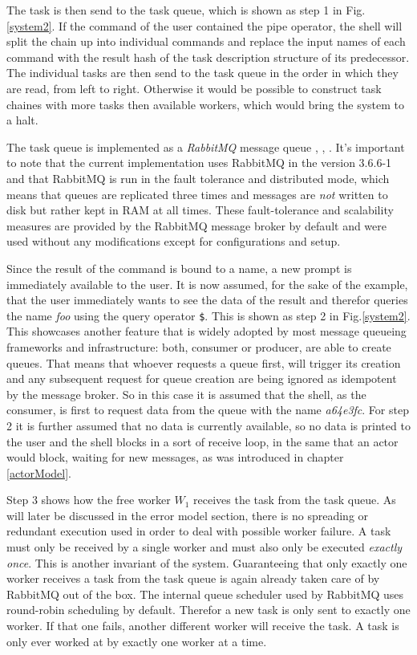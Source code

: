 The task is then send to the task queue, which is shown as step
1 in Fig.\ref{system2}. If the command of the user contained the
pipe operator, the shell will split the chain up into individual
commands and replace the input names of each command with the
result hash of the task description structure of its
predecessor. The individual tasks are then send to the task
queue in the order in which they are read, from left to right.
Otherwise it would be possible to construct task chaines with
more tasks then available workers, which would bring the system
to a halt.

The task queue is implemented
as a \textit{RabbitMQ} message queue \cite{rabbitmq},
\cite{rabbitmqwiki}, \cite{rabbitmqbook}. It's important to
note that the current implementation uses RabbitMQ in the
version 3.6.6-1 and that RabbitMQ is run in the fault tolerance
and distributed mode, which means that queues are replicated three
times and messages are \textit{not} written to disk but rather kept in
RAM at all times. These fault-tolerance and scalability measures
are provided by the RabbitMQ message broker by default and were
used without any modifications except for configurations and
setup.
\newline

Since the result of the command is bound to a name, a new
prompt is immediately available to the user. It is now assumed,
for the sake of the example, that the user immediately wants to
see the data of the result and therefor queries the name
\textit{foo} using the query operator \texttt{\$}. This is
shown as step 2 in Fig.\ref{system2}. This showcases another
feature that is widely adopted by most message queueing
frameworks and infrastructure: both, consumer or producer,
are able to create queues. That means that whoever requests
a queue first, will trigger its creation and any subsequent
request for queue creation are being ignored as idempotent
by the message broker. So in this case it is assumed that
the shell, as the consumer, is first to request data from the
queue with the name \textit{a64e3fc}. For step 2 it is further
assumed that no data is currently available, so no data is
printed to the user and the shell blocks in a sort of
receive loop, in the same that an actor would block, waiting
for new messages, as was introduced in chapter \ref{actorModel}.
\newline

Step 3 shows how the free worker $W_{1}$ receives the task from
the task queue. As will later be discussed in the error model
section, there is no spreading or redundant execution used in
order to deal with possible worker failure. A task must only
be received by a single worker and must also only be executed
\textit{exactly once}. This is another invariant of the system.
Guaranteeing that only exactly one worker receives a task
from the task queue is again already taken care of by RabbitMQ out
of the box. The internal queue scheduler used by RabbitMQ
uses round-robin scheduling by default. Therefor a new task
is only sent to exactly one worker. If that one fails, another
different worker will receive the task. A task is only ever
worked at by exactly one worker at a time.

